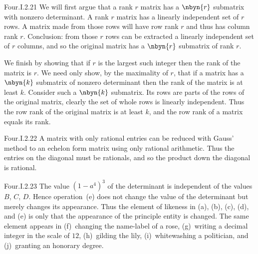 \begin{ans}{Four.I.2.21}
      We will first argue that a rank \( r \) matrix has a \( \nbyn{r} \)
      submatrix with nonzero determinant.
      A rank \( r \) matrix has a linearly independent set of \( r \) rows.
      A matrix made from those rows will have row rank \( r \) and thus has
      column rank \( r \).
      Conclusion: from those \( r \) rows can be extracted a linearly
      independent set of \( r \) columns, and so the original matrix has a
      \( \nbyn{r} \) submatrix of rank \( r \).

      We finish by showing that if \( r \) is the largest such integer then
      the rank of the matrix is \( r \).
      We need only show, by the maximality of \( r \),
      that if a matrix has a \( \nbyn{k} \) submatrix of
      nonzero determinant then the rank of the matrix is at least \( k \).
      Consider such a \( \nbyn{k} \) submatrix.
      Its rows are parts of the rows of the original matrix, clearly the
      set of whole rows is linearly independent.
      Thus the row rank of the original matrix is at least \( k \), and the row
      rank of a matrix equals its rank.
   
\end{ans}
\begin{ans}{Four.I.2.22}
      A matrix with only rational entries can be reduced with Gauss'
      method to an echelon form matrix using only rational arithmetic.
      Thus the entries on the diagonal must be rationals, and so the product
      down the diagonal is rational.
    
\end{ans}
\begin{ans}{Four.I.2.23}
       \answerasgiven
       The value \( (1-a^4)^3 \) of the determinant is independent of the
       values \( B \), \( C \), \( D \).
       Hence operation~(e) does not change the value of the determinant
       but merely changes its appearance.
       Thus the element of likeness in (a), (b), (c), (d), and (e) is
       only that the appearance of the principle entity is changed.
       The same element appears in (f)~changing the name-label of a rose,
       (g)~writing a decimal integer in the scale of \( 12 \), (h)~gilding
       the lily, (i)~whitewashing a politician, and (j)~granting an honorary
       degree.
    
\end{ans}
